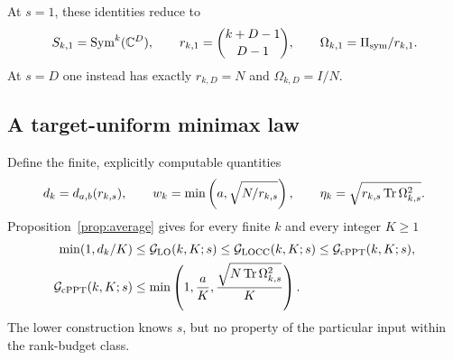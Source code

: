 At $s=1$, these identities reduce to
\[
 S_{k,1}=\operatorname{Sym}^k(\mathbb C^D),\qquad
 r_{k,1}=\binom{k+D-1}{D-1},\qquad
 \Omega_{k,1}=\Pi_{\rm sym}/r_{k,1}.
\]
At $s=D$ one instead has exactly $r_{k,D}=N$ and $\Omega_{k,D}=I/N$.

\subsection{A target-uniform minimax law}
Define the finite, explicitly computable quantities
\begin{equation}\label{eq:dw}
 d_k=d_{a,b}(r_{k,s}),\qquad
 w_k=\min\left(a,\sqrt{N/r_{k,s}}\right),\qquad
 \eta_k=\sqrt{r_{k,s}\operatorname{Tr}\Omega_{k,s}^2}.
\end{equation}
Proposition~\ref{prop:average} gives for every finite $k$ and every integer $K\ge1$
\begin{equation}\label{eq:minimax-finite}
 \begin{aligned}
 \min(1,d_k/K)&\le\mathcal G_{\mathrm{LO}}(k,K;s)\le\mathcal G_{\mathrm{LOCC}}(k,K;s)
 \le\mathcal G_{\mathrm{cPPT}}(k,K;s),\\
 \mathcal G_{\mathrm{cPPT}}(k,K;s)&\le\min\left(1,\frac aK,\frac{\sqrt{N\operatorname{Tr}\Omega_{k,s}^2}}K\right).
 \end{aligned}
\end{equation}
The lower construction knows $s$, but no property of the particular input within the rank-budget class.

